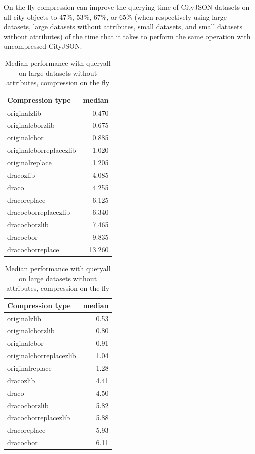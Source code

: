 On the fly compression can improve the querying time of CityJSON datasets on all city objects to 47\%, 53\%, 67\%, or 65\% (when respectively using large datasets, large datasets without attributes, small datasets, and small datasets without attributes) of the time that it takes to perform the same operation with uncompressed CityJSON.


\begin{table}[!h]
    \begin{minipage}{.5\linewidth}
      \caption{
Median performance with queryall on large datasets, compression on the fly}
\centering

\begin{tabular}{|l|r|}
\hline
Compression type & median\\
\hline
originalzlib & 0.470\\
\hline
originalcborzlib & 0.675\\
\hline
originalcbor & 0.885\\
\hline
originalcborreplacezlib & 1.020\\
\hline
originalreplace & 1.205\\
\hline
dracozlib & 4.085\\
\hline
draco & 4.255\\
\hline
dracoreplace & 6.125\\
\hline
dracocborreplacezlib & 6.340\\
\hline
dracocborzlib & 7.465\\
\hline
dracocbor & 9.835\\
\hline
dracocborreplace & 13.260\\
\hline
\end{tabular}
\end{minipage}%
    \begin{minipage}{.5\linewidth}
      \centering
        \caption{
Median performance with queryall on large datasets without attributes, compression on the fly}

\begin{tabular}{|l|r|}
\hline
Compression type & median\\
\hline
originalzlib & 0.53\\
\hline
originalcborzlib & 0.80\\
\hline
originalcbor & 0.91\\
\hline
originalcborreplacezlib & 1.04\\
\hline
originalreplace & 1.28\\
\hline
dracozlib & 4.41\\
\hline
draco & 4.50\\
\hline
dracocborzlib & 5.82\\
\hline
dracocborreplacezlib & 5.88\\
\hline
dracoreplace & 5.93\\
\hline
dracocbor & 6.11\\
\hline
\end{tabular}
\end{minipage} 
\end{table}
